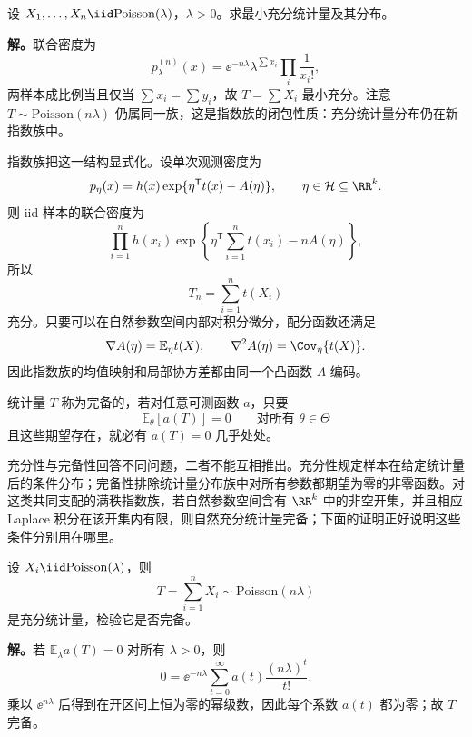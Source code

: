 \begin{workedexample}
设 $X_1,\ldots,X_n\iid\mathrm{Poisson}(\lambda)$，$\lambda>0$。求最小充分统计量及其分布。

\textbf{解。}联合密度为
\[
p_\lambda^{(n)}(x)=\ee^{-n\lambda}\lambda^{\sum x_i}\prod_i\frac1{x_i!},
\]
两样本成比例当且仅当 $\sum x_i=\sum y_i$，故 $T=\sum X_i$ 最小充分。注意 $T\sim\mathrm{Poisson}(n\lambda)$ 仍属同一族，这是指数族的闭包性质：充分统计量分布仍在新指数族中。
\end{workedexample}

\begin{definition}[自然指数族与充分统计量]
指数族把这一结构显式化。设单次观测密度为
\begin{equation}\label{eq:math-stat-exponential-family}
 p_\eta(x)
 =h(x)\exp\{\eta^{\mathsf T}t(x)-A(\eta)\},
 \qquad
 \eta\in\mathcal H\subseteq\RR^k.
\end{equation}
则 iid 样本的联合密度为
\[
 \prod_{i=1}^nh(x_i)
 \exp\!\left\{
 \eta^{\mathsf T}\sum_{i=1}^nt(x_i)-nA(\eta)
 \right\},
\]
所以
\[
 T_n=\sum_{i=1}^nt(X_i)
\]
充分。只要可以在自然参数空间内部对积分微分，配分函数还满足
\begin{equation*}\nabla A(\eta)=\mathbb E_\eta t(X),
 \qquad
 \nabla^2A(\eta)=\Cov_\eta\{t(X)\}.
\end{equation*}
因此指数族的均值映射和局部协方差都由同一个凸函数 $A$ 编码。
\end{definition}

\begin{definition}[完备统计量]
统计量 $T$ 称为完备的，若对任意可测函数 $a$，只要
\[
 \mathbb E_\theta[a(T)]=0
 \qquad\text{对所有 }\theta\in\Theta
\]
且这些期望存在，就必有 $a(T)=0$ 几乎处处。
\end{definition}

充分性与完备性回答不同问题，二者不能互相推出。充分性规定样本在给定统计量后的条件分布；完备性排除统计量分布族中对所有参数都期望为零的非零函数。对这类共同支配的满秩指数族，若自然参数空间含有 $\RR^k$ 中的非空开集，并且相应 Laplace 积分在该开集内有限，则自然充分统计量完备；下面的证明正好说明这些条件分别用在哪里。

\begin{workedexample}
设 $X_i\iid\mathrm{Poisson}(\lambda)$，则
\[
 T=\sum_{i=1}^nX_i\sim\mathrm{Poisson}(n\lambda)
\]
是充分统计量，检验它是否完备。

\textbf{解。}若 $\mathbb E_\lambda a(T)=0$ 对所有 $\lambda>0$，则
\[
 0=\ee^{-n\lambda}
 \sum_{t=0}^\infty a(t)\frac{(n\lambda)^t}{t!}.
\]
乘以 $\ee^{n\lambda}$ 后得到在开区间上恒为零的幂级数，因此每个系数 $a(t)$ 都为零；故 $T$ 完备。
\end{workedexample}


